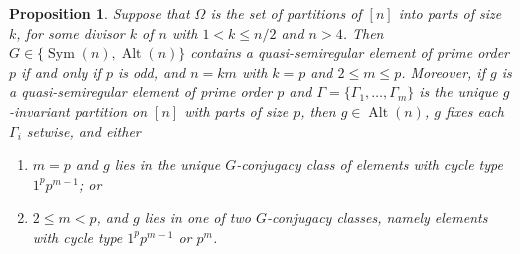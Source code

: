 \documentclass{article}
\newtheorem{prop}[thm]{Proposition}
\theoremstyle{remark}
\theoremstyle{definition}
\DeclareMathOperator{\Alt}{Alt}
\DeclareMathOperator{\Sym}{Sym}
\newcommand{\qsre}{quasi-semiregular element}
\begin{document}
\begin{prop}
\label{prop:k-part stab}
    Suppose that $\Omega$ is the set of partitions of $[n]$ into   parts of size $k$, for some divisor $k$ of $n$ with $1 < k \leqslant n/2$ and $n > 4$. Then $G\in\{\Sym(n), \Alt(n)\}$ contains a {\qsre} of prime order $p$ if and only if  $p$ is odd, and $n=km$ with  $k=p$ and  $2\leqslant m\leqslant p$. Moreover, if $g$ is a {\qsre}  of prime order $p$ and $\Gamma = \{ \Gamma_1,\ldots, \Gamma_m \}$ is the unique $g$-invariant partition on $[n]$ with parts of size $p$, then  $g\in\Alt(n)$, $g$ fixes each $\Gamma_i$ setwise, and either 
    \begin{enumerate}
        \item[(1)] $m=p$ and $g$ lies in the unique $G$-conjugacy class of elements with cycle type $1^pp^{m-1}$; or 
        \item[(2)] $2\leqslant m<p$, and $g$ lies in one of two $G$-conjugacy classes, namely elements with cycle type $1^pp^{m-1}$ or $p^{m}$.
    \end{enumerate}
\end{prop}
\end{document}
